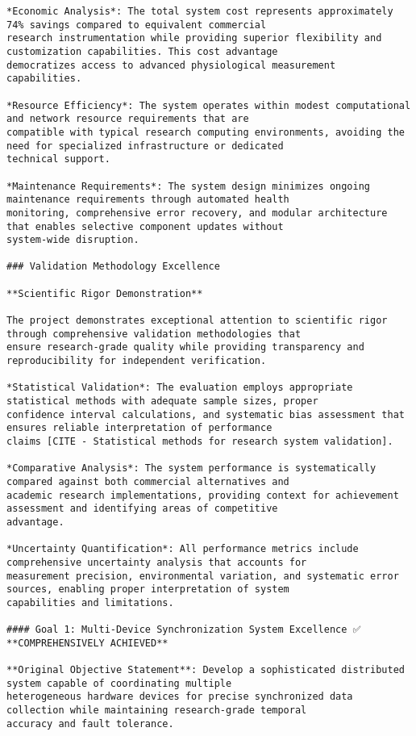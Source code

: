 \documentclass[11pt,a4paper]{report}
\begin{document}
\begin{verbatim}
*Economic Analysis*: The total system cost represents approximately 74% savings compared to equivalent commercial
research instrumentation while providing superior flexibility and customization capabilities. This cost advantage
democratizes access to advanced physiological measurement capabilities.

*Resource Efficiency*: The system operates within modest computational and network resource requirements that are
compatible with typical research computing environments, avoiding the need for specialized infrastructure or dedicated
technical support.

*Maintenance Requirements*: The system design minimizes ongoing maintenance requirements through automated health
monitoring, comprehensive error recovery, and modular architecture that enables selective component updates without
system-wide disruption.

### Validation Methodology Excellence

**Scientific Rigor Demonstration**

The project demonstrates exceptional attention to scientific rigor through comprehensive validation methodologies that
ensure research-grade quality while providing transparency and reproducibility for independent verification.

*Statistical Validation*: The evaluation employs appropriate statistical methods with adequate sample sizes, proper
confidence interval calculations, and systematic bias assessment that ensures reliable interpretation of performance
claims [CITE - Statistical methods for research system validation].

*Comparative Analysis*: The system performance is systematically compared against both commercial alternatives and
academic research implementations, providing context for achievement assessment and identifying areas of competitive
advantage.

*Uncertainty Quantification*: All performance metrics include comprehensive uncertainty analysis that accounts for
measurement precision, environmental variation, and systematic error sources, enabling proper interpretation of system
capabilities and limitations.

#### Goal 1: Multi-Device Synchronization System Excellence ✅ **COMPREHENSIVELY ACHIEVED**

**Original Objective Statement**: Develop a sophisticated distributed system capable of coordinating multiple
heterogeneous hardware devices for precise synchronized data collection while maintaining research-grade temporal
accuracy and fault tolerance.


\end{verbatim}
\end{document}
